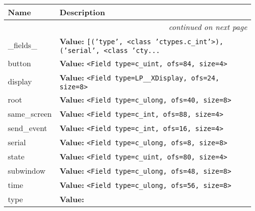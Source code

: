    \vspace{-1cm}
\hspace{\varindent}\begin{longtable}{|p{\varnamewidth}|p{\vardescrwidth}|l}
\cline{1-2}
\cline{1-2} \centering \textbf{Name} & \centering \textbf{Description}& \\
\cline{1-2}
\endhead\cline{1-2}\multicolumn{3}{r}{\small\textit{continued on next page}}\\\endfoot\cline{1-2}
\endlastfoot\raggedright \_\-f\-i\-e\-l\-d\-s\-\_\- & \raggedright \textbf{Value:} 
{\tt \texttt{[}\texttt{(}\texttt{'}\texttt{type}\texttt{'}\texttt{, }{\textless}class 'ctypes.c\_int'{\textgreater}\texttt{)}\texttt{, }\texttt{(}\texttt{'}\texttt{serial}\texttt{'}\texttt{, }{\textless}class 'cty\texttt{...}}&\\
\cline{1-2}
\raggedright b\-u\-t\-t\-o\-n\- & \raggedright \textbf{Value:} 
{\tt {\textless}Field type=c\_uint, ofs=84, size=4{\textgreater}}&\\
\cline{1-2}
\raggedright d\-i\-s\-p\-l\-a\-y\- & \raggedright \textbf{Value:} 
{\tt {\textless}Field type=LP\_\_XDisplay, ofs=24, size=8{\textgreater}}&\\
\cline{1-2}
\raggedright r\-o\-o\-t\- & \raggedright \textbf{Value:} 
{\tt {\textless}Field type=c\_ulong, ofs=40, size=8{\textgreater}}&\\
\cline{1-2}
\raggedright s\-a\-m\-e\-\_\-s\-c\-r\-e\-e\-n\- & \raggedright \textbf{Value:} 
{\tt {\textless}Field type=c\_int, ofs=88, size=4{\textgreater}}&\\
\cline{1-2}
\raggedright s\-e\-n\-d\-\_\-e\-v\-e\-n\-t\- & \raggedright \textbf{Value:} 
{\tt {\textless}Field type=c\_int, ofs=16, size=4{\textgreater}}&\\
\cline{1-2}
\raggedright s\-e\-r\-i\-a\-l\- & \raggedright \textbf{Value:} 
{\tt {\textless}Field type=c\_ulong, ofs=8, size=8{\textgreater}}&\\
\cline{1-2}
\raggedright s\-t\-a\-t\-e\- & \raggedright \textbf{Value:} 
{\tt {\textless}Field type=c\_uint, ofs=80, size=4{\textgreater}}&\\
\cline{1-2}
\raggedright s\-u\-b\-w\-i\-n\-d\-o\-w\- & \raggedright \textbf{Value:} 
{\tt {\textless}Field type=c\_ulong, ofs=48, size=8{\textgreater}}&\\
\cline{1-2}
\raggedright t\-i\-m\-e\- & \raggedright \textbf{Value:} 
{\tt {\textless}Field type=c\_ulong, ofs=56, size=8{\textgreater}}&\\
\cline{1-2}
\raggedright t\-y\-p\-e\- & \raggedright \textbf{Value:} 

\end{longtable}
